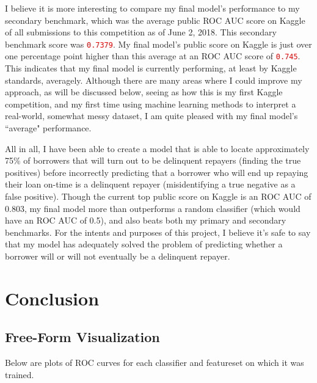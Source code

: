 \documentclass[12pt, letterpaper]{article}
\begin{document}
I believe it is more interesting to compare my final model's performance to my secondary benchmark, which was the average public ROC AUC score on Kaggle of all submissions to this competition as of June 2, 2018. This secondary benchmark score was \colorbox{backcolor}{\textcolor{red}{\texttt{0.7379}}}. My final model's public score on Kaggle is just over one percentage point higher than this average at an ROC AUC score of \colorbox{backcolor}{\textcolor{red}{\texttt{0.745}}}. This indicates that my final model is currently performing, at least by Kaggle standards, averagely. Although there are many areas where I could improve my approach, as will be discussed below, seeing as how this is my first Kaggle competition, and my first time using machine learning methods to interpret a real-world, somewhat messy dataset, I am quite pleased with my final model's ``average" performance.

All in all, I have been able to create a model that is able to locate approximately 75\% of borrowers that will turn out to be delinquent repayers (finding the true positives) before incorrectly predicting that a borrower who will end up repaying their loan on-time is a delinquent repayer (misidentifying a true negative as a false positive). Though the current top public score on Kaggle is an ROC AUC of 0.803, my final model more than outperforms a random classifier (which would have an ROC AUC of 0.5), and also beats both my primary and secondary benchmarks. For the intents and purposes of this project, I believe it's safe to say that my model has adequately solved the problem of predicting whether a borrower will or will not eventually be a delinquent repayer.

\section{Conclusion}
\subsection{Free-Form Visualization}
Below are plots of ROC curves for each classifier and featureset on which it was trained.

\pagebreak
\end{document}
